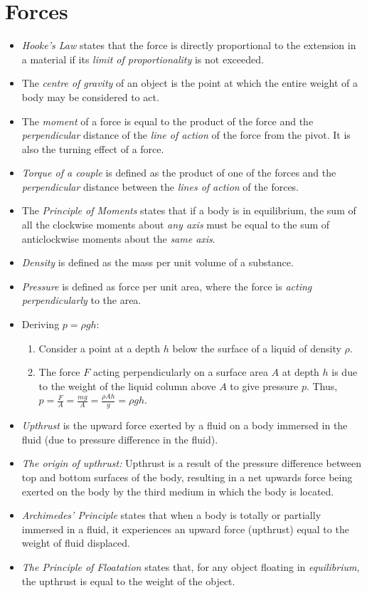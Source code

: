 \documentclass[oneside]{book}
\begin{document}
\chapter{Forces}
\begin{itemize}
    \item \textit{Hooke's Law} states that the force is directly proportional to the extension in a material if its \emph{limit of proportionality} is not exceeded.
    \item The \textit{centre of gravity} of an object is the point at which the entire weight of a body may be considered to act.
    \item The \textit{moment} of a force is equal to the product of the force and the \emph{perpendicular} distance of the \emph{line of action} of the force from the pivot. It is also the turning effect of a force.
    \item \textit{Torque of a couple} is defined as the product of one of the forces and the \emph{perpendicular} distance between the \emph{lines of action} of the forces.
    \item The \textit{Principle of Moments} states that if a body is in equilibrium, the sum of all the clockwise moments about \emph{any axis} must be equal to the sum of anticlockwise moments about the \emph{same axis}.
    \item \textit{Density} is defined as the mass per unit volume of a substance.
    \item \textit{Pressure} is defined as force per unit area, where the force is \emph{acting perpendicularly} to the area.
    \item Deriving \(p=\rho gh\):
    \begin{enumerate}
        \item Consider a point at a depth \(h\) below the surface of a liquid of density \(\rho\). 
        \item The force \(F\) acting perpendicularly on a surface area \(A\) at depth \(h\) is due to the weight of the liquid column above \(A\) to give pressure \(p\). Thus, \(p=\frac{F}{A}=\frac{mg}{A}=\frac{\rho Ah}{g}=\rho gh\).
    \end{enumerate}
    \item \textit{Upthrust} is the upward force exerted by a fluid on a body immersed in the fluid (due to pressure difference in the fluid).
    \item \textit{The origin of upthrust:} Upthrust is a result of the pressure difference between top and bottom surfaces of the body, resulting in a net upwards force being exerted on the body by the third medium in which the body is located.
    \item \textit{Archimedes' Principle} states that when a body is totally or partially immersed in a fluid, it experiences an upward force (upthrust) equal to the weight of fluid displaced.
    \item \textit{The Principle of Floatation} states that, for any object floating in \emph{equilibrium}, the upthrust is equal to the weight of the object.
\end{itemize}
\end{document}

